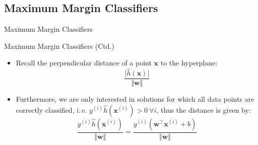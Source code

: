 \subsection{Maximum Margin Classifiers}

\begin{frame}{Maximum Margin Classifiers}{}\important
\end{frame}


\begin{frame}{Maximum Margin Classifiers (Ctd.)}{}
	\begin{itemize}
		\item Recall the perpendicular distance of a point $\bm{x}$ to the hyperplane:
		\begin{equation}
			\frac{\vert \widehat{h}(\bm{x}) \vert}{\Vert \bm{w} \Vert}
		\end{equation}
		\item Furthermore, we are only interested in solutions for which all data points are correctly classified, i.\,e. 
			$y^{(i)} \widehat{h}(\bm{x}^{(i)}) > 0\ \forall i$, thus the distance is given by:
		\begin{equation}
			\frac{y^{(i)} \widehat{h}(\bm{x}^{(i)})}{\Vert \bm{w} \Vert} = \frac{y^{(i)} (\bm{w}^{\intercal} \bm{x}^{(i)} + b)}{\Vert \bm{w} \Vert}
		\end{equation}
	\end{itemize}
\end{frame}



